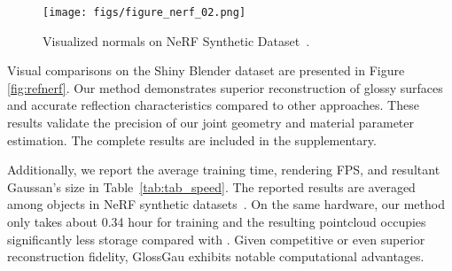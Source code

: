 \begin{figure}
    \centering
    {\texttt{[image: figs/figure\_nerf\_02.png]}}
    \caption{Visualized normals on NeRF Synthetic Dataset~\cite{mildenhall2020nerf}.
    }
    \label{fig:nerf_normal}
\end{figure}


Visual comparisons on the Shiny Blender dataset are presented in Figure \ref{fig:refnerf}. Our method demonstrates superior reconstruction of glossy surfaces and accurate reflection characteristics compared to other approaches. These results validate the precision of our joint geometry and material parameter estimation. The complete results are included in the supplementary. 


\begin{figure*}[t]
    \centering
    \vspace{-3ex}
    \vspace{-1ex}
    \caption{The qualitative comparisons on Glossy Synthetic Dataset~\cite{liu2023nero}. Our method accurately characterizes surface roughness and generates realistic and smooth reflection effects compared with prior GS-based inverse rendering methods.
    }
    \label{fig:glossy}
      
\end{figure*}

\begin{figure*}[t]
\vspace{-1ex}
    \centering
    \caption{Visualized comparisons on Shiny Blender Dataset~\cite{verbin2022ref}.
    }
    \label{fig:refnerf}
    \vspace{-2ex}
\end{figure*}



Additionally, we report the average training time, rendering FPS, and resultant Gaussan's size in Table~\ref{tab:tab_speed}. The reported results are averaged among objects in NeRF synthetic datasets~\cite{mildenhall2020nerf}. On the same hardware, our method only takes about 0.34 hour for training and the resulting pointcloud occupies significantly less storage compared with \cite{gao2023relightable}. Given competitive or even superior reconstruction fidelity, GlossGau exhibits notable computational advantages. 


